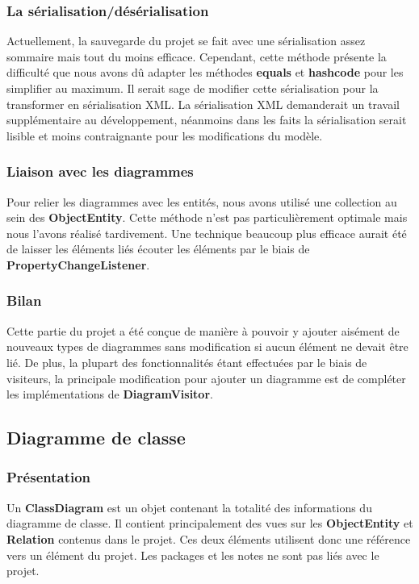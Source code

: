 \documentclass[hidelinks, 10pt,a4paper]{article}
\begin{document}
   \subsubsection{La sérialisation/désérialisation}
   Actuellement, la sauvegarde du projet se fait avec une sérialisation assez sommaire mais tout du moins efficace. 
   Cependant, cette méthode présente la difficulté que nous avons dû adapter les méthodes \textbf{equals} et \textbf{hashcode} 
   pour les simplifier au maximum. Il serait sage de modifier cette sérialisation pour la transformer en sérialisation XML. 
   La sérialisation XML demanderait un travail supplémentaire au développement, 
   néanmoins dans les faits la sérialisation serait lisible et moins contraignante pour les modifications du modèle.
   
   \subsubsection{Liaison avec les diagrammes}
   Pour relier les diagrammes avec les entités, nous avons utilisé une collection au sein des \textbf{ObjectEntity}. 
   Cette méthode n'est pas particulièrement optimale mais nous l'avons réalisé tardivement.
   Une technique beaucoup plus efficace aurait été de laisser les éléments liés écouter les éléments par le biais de \textbf{PropertyChangeListener}.
   
   \subsubsection{Bilan}
   Cette partie du projet a été conçue de manière à pouvoir y ajouter aisément de nouveaux types de diagrammes sans modification si aucun élément ne devait être lié.
   De plus, la plupart des fonctionnalités étant effectuées par le biais de visiteurs, 
   la principale modification pour ajouter un diagramme est de compléter les implémentations de \textbf{DiagramVisitor}.
  
  \subsection{Diagramme de classe}
  \subsubsection{Présentation}
    Un \textbf{ClassDiagram} est un objet contenant la totalité des informations du diagramme de classe. 
    Il contient principalement des vues sur les \textbf{ObjectEntity} et \textbf{Relation} contenus dans le projet. 
    Ces deux éléments utilisent donc une référence vers un élément du projet.
    Les packages et les notes ne sont pas liés avec le projet.
  
\end{document}
